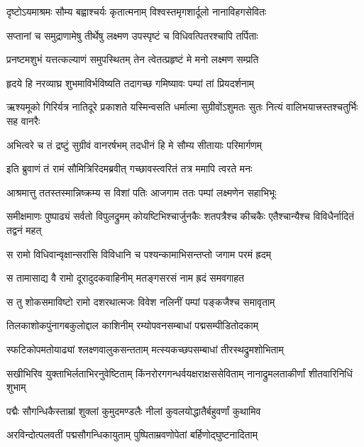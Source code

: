 \twolineshloka
{दृष्टोऽयमाश्रमः सौम्य बह्वाश्चर्यः कृतात्मनाम्}
{विश्वस्तमृगशार्दूलो नानाविहगसेवितः} %

\twolineshloka
{सप्तानां च समुद्राणामेषु तीर्थेषु लक्ष्मण}
{उपस्पृष्टं च विधिवत्पितरश्चापि तर्पिताः} %

\twolineshloka
{प्रनष्टमशुभं यत्तत्कल्याणं समुपस्थितम्}
{तेन त्वेतत्प्रहृष्टं मे मनो लक्ष्मण सम्प्रति} %

\twolineshloka
{हृदये हि नरव्याघ्र शुभमाविर्भविष्यति}
{तदागच्छ गमिष्यावः पम्पां तां प्रियदर्शनाम्} %

\threelineshloka
{ऋश्यमूको गिरिर्यत्र नातिदूरे प्रकाशते}
{यस्मिन्वसति धर्मात्मा सुग्रीवोंऽशुमतः सुतः}
{नित्यं वालिभयात्त्रस्तश्चतुर्भिः सह वानरैः} %

\twolineshloka
{अभित्वरे च तं द्रष्टुं सुग्रीवं वानरर्षभम्}
{तदधीनं हि मे सौम्य सीतायाः परिमार्गणम्} %

\twolineshloka
{इति ब्रुवाणं तं रामं सौमित्रिरिदमब्रवीत्}
{गच्छावस्त्वरितं तत्र ममापि त्वरते मनः} %

\twolineshloka
{आश्रमात्तु ततस्तस्मान्निष्क्रम्य स विशां पतिः}
{आजगाम ततः पम्पां लक्ष्मणेन सहाभिभूः} %

\threelineshloka
{समीक्षमाणः पुष्पाढ्यं सर्वतो विपुलद्रुमम्}
{कोयष्टिभिश्चार्जुनकैः शतपत्रैश्च कीचकैः}
{एतैश्चान्यैश्च विविधैर्नादितं तद्वनं महत्} %

\twolineshloka
{स रामो विधिवान्वृक्षान्सरांसि विविधानि च}
{पश्यन्कामाभिसन्तप्तो जगाम परमं ह्रदम्} %

\twolineshloka
{स तामासाद्य वै रामो दूरादुदकवाहिनीम्}
{मतङ्गसरसं नाम ह्रदं समवगाहत} %

\twolineshloka
{स तु शोकसमाविष्टो रामो दशरथात्मजः}
{विवेश नलिनीं पम्पां पङ्कजैश्च समावृताम्} %

\twolineshloka
{तिलकाशोकपुंनागबकुलोद्दाल काशिनीम्}
{रम्योपवनसम्बाधां पद्मसम्पीडितोदकाम्} %

\twolineshloka
{स्फटिकोपमतोयाढ्यां श्लक्ष्णवालुकसन्तताम्}
{मत्स्यकच्छपसम्बाधां तीरस्थद्रुमशोभिताम्} %

\threelineshloka
{सखीभिरिव युक्ताभिर्लताभिरनुवेष्टिताम्}
{किंनरोरगगन्धर्वयक्षराक्षससेविताम्}
{नानाद्रुमलताकीर्णां शीतवारिनिधिं शुभाम्} %

\twolineshloka
{पद्मैः सौगन्धिकैस्ताम्रां शुक्लां कुमुदमण्डलैः}
{नीलां कुवलयोद्धातैर्बहुवर्णां कुथामिव} %

\twolineshloka
{अरविन्दोत्पलवतीं पद्मसौगन्धिकायुताम्}
{पुष्पिताम्रवणोपेतां बर्हिणोद्घुष्टनादिताम्} %

